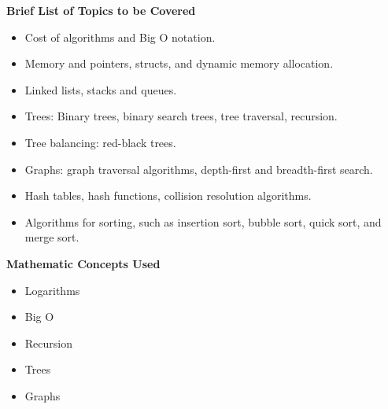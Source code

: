 {    \noindent \textbf{Brief List of Topics to be Covered}
    \begin{itemize}
        \item Cost of algorithms and Big O notation.
        \item Memory and pointers, structs, and dynamic memory allocation.
        \item Linked lists, stacks and queues.
        \item Trees: Binary trees, binary search trees, tree traversal, recursion.
        \item Tree balancing: red-black trees.
        \item Graphs: graph traversal algorithms, depth-first and breadth-first search.
        \item Hash tables, hash functions, collision resolution algorithms.
        \item Algorithms for sorting, such as insertion sort, bubble sort, quick sort, and merge sort.
    \end{itemize}
    
    \noindent \textbf{Mathematic Concepts Used}
    \begin{itemize}
        \item Logarithms
        \item Big O
        \item Recursion
        \item Trees
        \item Graphs
    \end{itemize}   
}

